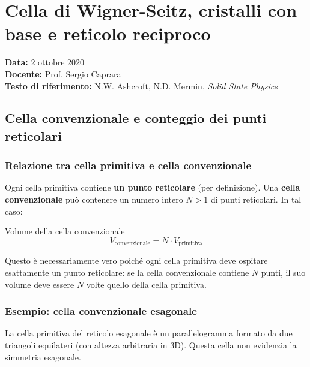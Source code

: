 \chapter{Cella di Wigner-Seitz, cristalli con base e reticolo reciproco}

\begin{nota}
\textbf{Data:} 2 ottobre 2020\\
\textbf{Docente:} Prof. Sergio Caprara\\
\textbf{Testo di riferimento:} N.W. Ashcroft, N.D. Mermin, \textit{Solid State Physics}
\end{nota}

\vspace{0.5cm}


\section{Cella convenzionale e conteggio dei punti reticolari}

\subsection*{Relazione tra cella primitiva e cella convenzionale}

Ogni cella primitiva contiene \textbf{un punto reticolare} (per definizione). Una \textbf{cella convenzionale} può contenere un numero intero $N > 1$ di punti reticolari. In tal caso:

\begin{equazione}{Volume della cella convenzionale}
\begin{equation}
V_{\text{convenzionale}} = N \cdot V_{\text{primitiva}}
\end{equation}
\end{equazione}

Questo è necessariamente vero poiché ogni cella primitiva deve ospitare esattamente un punto reticolare: se la cella convenzionale contiene $N$ punti, il suo volume deve essere $N$ volte quello della cella primitiva.

\subsection*{Esempio: cella convenzionale esagonale}

La cella primitiva del reticolo esagonale è un parallelogramma formato da due triangoli equilateri (con altezza arbitraria in 3D). Questa cella non evidenzia la simmetria esagonale.

